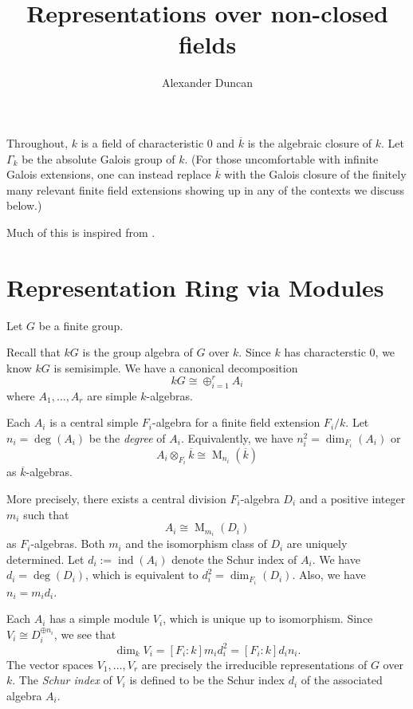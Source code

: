 \documentclass[12pt]{article}
\theoremstyle{plain}
\theoremstyle{definition}
\theoremstyle{remark}
\numberwithin{equation}{section}
\begin{document}
\title{Representations over non-closed fields}
\author{Alexander Duncan}

\maketitle

Throughout, $k$ is a field of characteristic $0$
and $\overline{k}$ is the algebraic closure of $k$.
Let $\Gamma_k$ be the absolute Galois group of $k$.
(For those uncomfortable with infinite Galois extensions,
one can instead replace $\overline{k}$ with the Galois closure
of the finitely many relevant finite field extensions
showing up in any of the contexts we discuss below.)

Much of this is inspired from \cite[\S{12--13}]{Serre}.

\section{Representation Ring via Modules}

Let $G$ be a finite group.

Recall that $kG$ is the group algebra of $G$ over $k$.
Since $k$ has characterstic $0$, we know $kG$ is semisimple.
We have a canonical decomposition
\[
kG \cong \oplus_{i=1}^r A_i
\]
where $A_1,\ldots,A_r$ are simple $k$-algebras.

Each $A_i$ is a central simple $F_i$-algebra
for a finite field extension $F_i/k$.
Let $n_i = \deg(A_i)$ be the \emph{degree} of $A_i$.
Equivalently, we have $n_i^2 = \dim_{F_i}(A_i)$
or
\[
A_i \otimes_{F_i} \overline{k} \cong
\operatorname{M}_{n_i}(\overline{k})
\]
as $\overline{k}$-algebras.

More precisely, there exists a central division $F_i$-algebra $D_i$
and a positive integer $m_i$ such that
\[
A_i \cong \operatorname{M}_{m_i}(D_i)
\]
as $F_i$-algebras.
Both $m_i$ and the isomorphism class of $D_i$ are uniquely determined.
Let $d_i := \operatorname{ind}(A_i)$ denote the Schur index of $A_i$.
We have $d_i = \deg(D_i)$, which is equivalent to
$d_i^2=\dim_{F_i}(D_i)$.  Also, we have $n_i=m_id_i$.

Each $A_i$ has a simple module $V_i$, which is unique up to isomorphism.
Since $V_i \cong D_i^{\oplus n_i}$, we see that
\[
\dim_k V_i = [F_i:k]m_id_i^2 = [F_i:k]d_in_i .
\]
The vector spaces $V_1,\ldots,V_r$ are precisely the
irreducible representations of $G$ over $k$.
The \emph{Schur index} of $V_i$ is defined to be the
Schur index $d_i$ of the associated algebra $A_i$.
\end{document}
